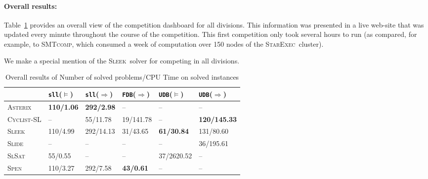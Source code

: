 \documentclass[twoside,11pt]{article}
\newcommand{\limp}{\Rightarrow}
\newcommand{\sllsat}{\texttt{sll}($\models$)}
\newcommand{\sllent}{\texttt{sll}($\limp$)}
\newcommand{\FDBent}{\texttt{FDB}($\limp$)}
\newcommand{\UDBsat}{\texttt{UDB}($\models$)}
\newcommand{\UDBent}{\texttt{UDB}($\limp$)}
\newcommand{\ASTERIX}{\textsc{Asterix}}
\newcommand{\CYCLIST}{\textsc{Cyclist-SL}}
\newcommand{\SLEEK}{\textsc{Sleek}}
\newcommand{\SLIDE}{\textsc{Slide}}
\newcommand{\SLSAT}{\textsc{SlSat}}
\newcommand{\SPEN}{\textsc{Spen}}
\newcommand{\smtcomp}{\textsc{SMTcomp}}
\newcommand{\starexec}{\textsc{StarExec}}
\begin{document}
\paragraph{Overall results:}
Table~\ref{tab:overall} provides an overall view of the competition dashboard for all divisions. This information was presented in a live web-site that was updated every minute throughout the course of the competition. This first competition only took several hours to run (as compared, for example, to \smtcomp, which consumed a week of computation over 150 nodes of the \starexec\ cluster).
 
We make a special mention of the \SLEEK\ solver for competing in all divisions.


\begin{table}
\begin{center}
\begin{tabular}{p{2cm}p{2cm}p{2cm}p{2cm}p{2cm}p{2cm}}\hline
& \sllsat & \sllent & \FDBent
& \UDBsat & \UDBent \\\hline
\ASTERIX &
\textbf{110/1.06} &  %
\textbf{292/2.98} &  %
-- &
-- &
--
\\\hline
\CYCLIST &
-- &
55/11.78 & %
19/141.78 & %
-- &
\textbf{120/145.33} %
\\\hline
\SLEEK &
110/4.99 & %
292/14.13 & %
31/43.65 & %
\textbf{61/30.84} & %
131/80.60 %
\\\hline
\SLIDE &
-- &
-- &
-- &
-- &
36/195.61 %
\\\hline
\SLSAT &
55/0.55 & %
--  &
--  &
37/2620.52 & %
--
\\\hline
\SPEN &
110/3.27 & %
292/7.58 & %
\textbf{43/0.61} & %
-- &
--
\\\hline
\end{tabular}
\end{center}
\caption{Overall results of Number of solved problems/CPU Time on solved instances %
}
\label{tab:overall}
\end{table}
\end{document}

